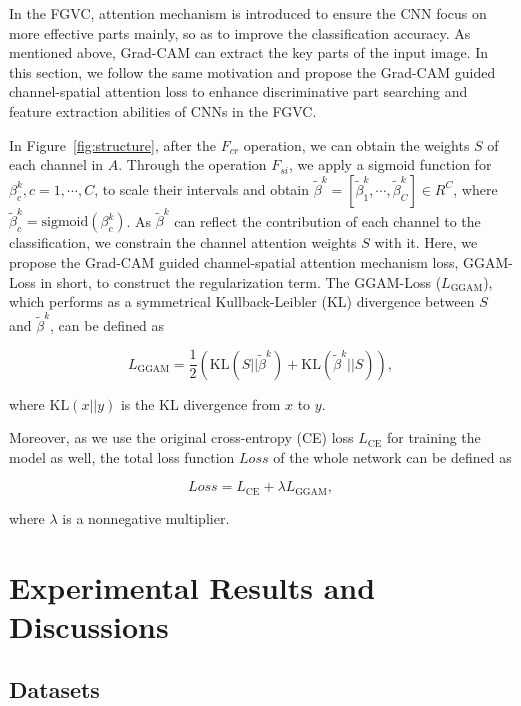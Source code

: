 \documentclass{article}
\begin{document}
In the FGVC, attention mechanism is introduced to ensure the CNN focus on more effective parts mainly, so as to improve the classification accuracy. As mentioned above, Grad-CAM can extract the key parts of the input image. In this section, we follow the same motivation and propose the Grad-CAM guided channel-spatial attention loss to enhance discriminative part searching and feature extraction abilities of CNNs in the FGVC. 

In Figure~\ref{fig:structure}, after the $F_{cr}$ operation, we can obtain the weights $S$ of each channel in $A$. Through the operation $F_{si}$, we apply a sigmoid function for $\beta_c^k,c=1,\cdots,C$, to scale their intervals and obtain $\tilde{\beta}^k=[\tilde{\beta}_{1}^k,\cdots,\tilde{\beta}_{C}^k]\in R^C$, where $\tilde{\beta}_{c}^k=\text{sigmoid}(\beta_c^k)$. As $\tilde{\beta}^k$ can reflect the contribution of each channel to the classification, we constrain the channel attention weights $S$ with it. Here, we propose the Grad-CAM guided channel-spatial attention mechanism loss, GGAM-Loss in short, to construct the regularization term. The GGAM-Loss ($L_{\text{GGAM}}$), which performs as a symmetrical Kullback-Leibler (KL) divergence between $S$ and $\tilde{\beta}^k$, can be defined as

\begin{equation}
    L_{\text{GGAM}} = \frac{1}{2}\left(\text{KL}(S||\tilde{\beta}^k) + \text{KL}(\tilde{\beta}^k||S)\right),
\end{equation}

\noindent where $\text{KL}(x||y)$ is the KL divergence from $x$ to $y$.

Moreover, as we use the original cross-entropy (CE) loss $L_{\text{CE}}$ for training the model as well, the total loss function $Loss$ of the whole network can be defined as

\begin{equation}
    Loss=L_{\text{CE}}+\lambda L_{\text{GGAM}},
\end{equation}

\noindent where $\lambda$ is a nonnegative multiplier.






 

\section{Experimental Results and Discussions}

\subsection{Datasets}
\end{document}
